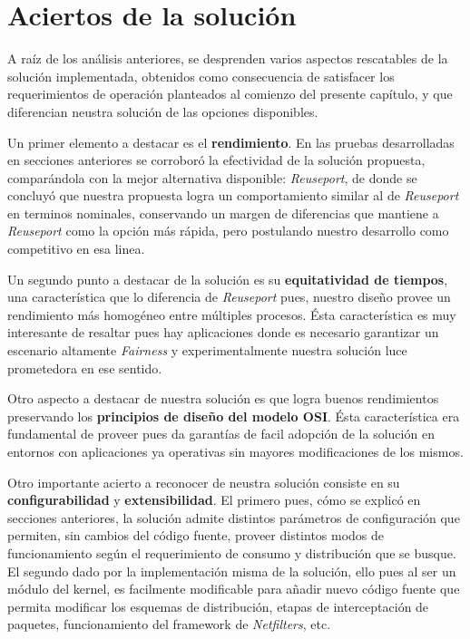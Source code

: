 \section{Aciertos de la solución}

A raíz de los análisis anteriores, se desprenden varios aspectos rescatables de la solución implementada, obtenidos como consecuencia de satisfacer los requerimientos de operación planteados al comienzo del presente capítulo, y que diferencian neustra solución de las opciones disponibles.

Un primer elemento a destacar es el \textbf{rendimiento}. En las pruebas desarrolladas en secciones anteriores se corroboró la efectividad de la solución propuesta, comparándola con la mejor alternativa disponible: \emph{Reuseport}, de donde se concluyó que nuestra propuesta logra un comportamiento similar al de \emph{Reuseport} en terminos nominales, conservando un margen de diferencias que mantiene a \emph{Reuseport} como la opción más rápida, pero postulando nuestro desarrollo como competitivo en esa linea.

Un segundo punto a destacar de la solución es su \textbf{equitatividad de tiempos}, una característica que lo diferencia de \emph{Reuseport} pues, nuestro diseño provee un rendimiento más homogéneo entre múltiples procesos. Ésta característica es muy interesante de resaltar pues hay aplicaciones donde es necesario garantizar un escenario altamente \emph{Fairness} y experimentalmente nuestra solución luce prometedora en ese sentido.

Otro aspecto a destacar de nuestra solución es que logra buenos rendimientos preservando los \textbf{principios de diseño del modelo OSI}. Ésta característica era fundamental de proveer pues da garantías de facil adopción de la solución en entornos con aplicaciones ya operativas sin mayores modificaciones de los mismos.

Otro importante acierto a reconocer de neustra solución consiste en su \textbf{configurabilidad} y \textbf{extensibilidad}. El primero pues, cómo se explicó en secciones anteriores, la solución admite distintos parámetros de configuración que permiten, sin cambios del código fuente, proveer distintos modos de funcionamiento según el requerimiento de consumo y distribución que se busque. El segundo dado por la implementación misma de la solución, ello pues al ser un módulo del kernel, es facilmente modificable para añadir nuevo código fuente que permita modificar los esquemas de distribución, etapas de interceptación de paquetes, funcionamiento del framework de \emph{Netfilters}, etc.


